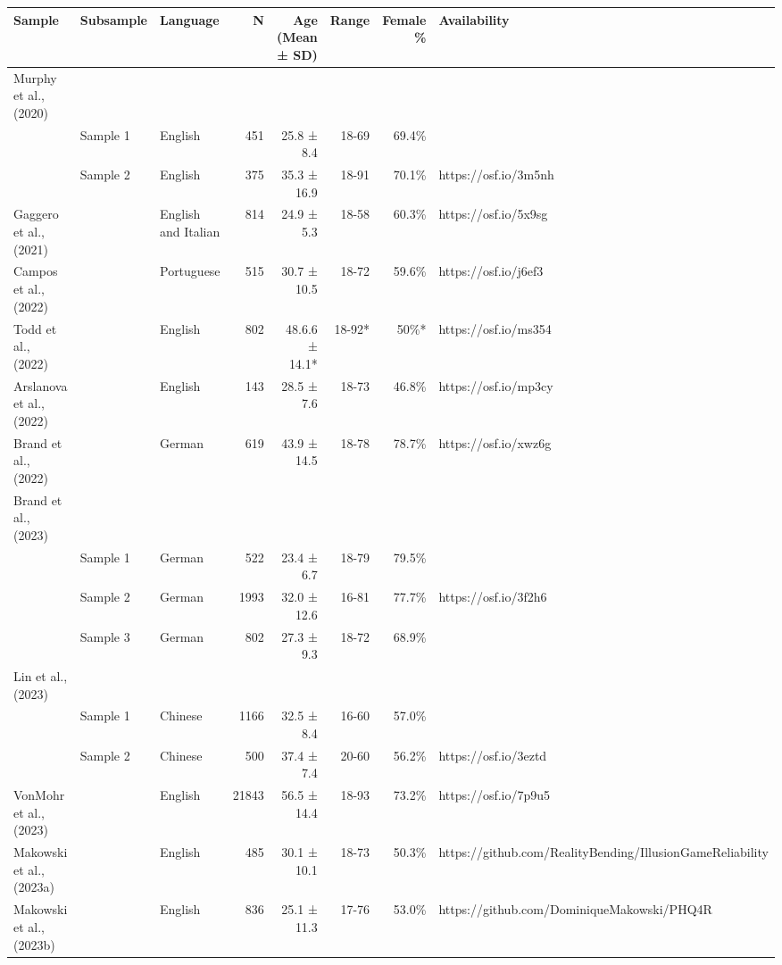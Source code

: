 \begin{table}[!t]
\fontsize{9.0pt}{10.8pt}\selectfont
\begin{tabular*}{\linewidth}{@{\extracolsep{\fill}}lllrrrrl}
\toprule
Sample & Subsample & Language & N & Age (Mean  ± SD) & Range & Female \% & Availability \\ 
\midrule\addlinespace[2.5pt]
Murphy et al., (2020) &  &  &  &  &  &  &  \\ 
 & Sample 1 & English & 451 & 25.8 ± 8.4 & 18-69 & 69.4\% &  \\ 
 & Sample 2 & English & 375 & 35.3 ± 16.9 & 18-91 & 70.1\% & https://osf.io/3m5nh \\ 
Gaggero et al., (2021) &  & English and Italian & 814 & 24.9 ± 5.3 & 18-58 & 60.3\% & https://osf.io/5x9sg \\ 
Campos et al., (2022) &  & Portuguese & 515 & 30.7 ± 10.5 & 18-72 & 59.6\% & https://osf.io/j6ef3 \\ 
Todd et al., (2022) &  & English & 802 & 48.6.6 ± 14.1* & 18-92* & 50\%* & https://osf.io/ms354 \\ 
Arslanova et al., (2022) &  & English & 143 & 28.5 ± 7.6 & 18-73 & 46.8\% & https://osf.io/mp3cy \\ 
Brand et al., (2022) &  & German & 619 & 43.9 ± 14.5 & 18-78 & 78.7\% & https://osf.io/xwz6g \\ 
Brand et al., (2023) &  &  &  &  &  &  &  \\ 
 & Sample 1 & German & 522 & 23.4 ± 6.7 & 18-79 & 79.5\% &  \\ 
 & Sample 2 & German & 1993 & 32.0 ± 12.6 & 16-81 & 77.7\% & https://osf.io/3f2h6 \\ 
 & Sample 3 & German & 802 & 27.3 ± 9.3 & 18-72 & 68.9\% &  \\ 
Lin et al., (2023) &  &  &  &  &  &  &  \\ 
 & Sample 1 & Chinese & 1166 & 32.5 ± 8.4 & 16-60 & 57.0\% &  \\ 
 & Sample 2 & Chinese & 500 & 37.4 ± 7.4 & 20-60 & 56.2\% & https://osf.io/3eztd \\ 
VonMohr et al., (2023) &  & English & 21843 & 56.5 ± 14.4 & 18-93 & 73.2\% & https://osf.io/7p9u5 \\ 
Makowski et al., (2023a) &  & English & 485 & 30.1 ± 10.1 & 18-73 & 50.3\% & https://github.com/RealityBending/IllusionGameReliability \\ 
Makowski et al., (2023b) &  & English & 836 & 25.1 ± 11.3 & 17-76 & 53.0\% & https://github.com/DominiqueMakowski/PHQ4R \\ 

\end{tabular*}
\end{table}

